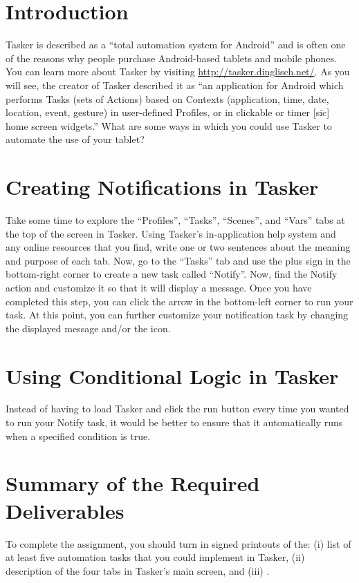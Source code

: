 

\usepackage[compact]{titlesec}



\section*{Introduction}

Tasker is described as a ``total automation system for Android'' and is often one of the reasons why people purchase
Android-based tablets and mobile phones.  You can learn more about Tasker by visiting
\url{http://tasker.dinglisch.net/}. As you will see, the creator of Tasker described it as ``an application for Android
which performs Tasks (sets of Actions) based on Contexts (application, time, date, location, event, gesture) in
user-defined Profiles, or in clickable or timer [sic] home screen widgets.''  What are some ways in which you could use
Tasker to automate the use of your tablet?

\section*{Creating Notifications in Tasker}

Take some time to explore the ``Profiles'', ``Tasks'', ``Scenes'', and ``Vars'' tabs at the top of the screen in Tasker.
Using Tasker's in-application help system and any online resources that you find, write one or two sentences about
the meaning and purpose of each tab. Now, go to the ``Tasks'' tab and use the plus sign in the bottom-right corner to
create a new task called ``Notify''.  Now, find the Notify action and customize it so that it will display a message.
Once you have completed this step, you can click the arrow in the bottom-left corner to run your task.  At this point,
you can further customize your notification task by changing the displayed message and/or the icon. 

\section*{Using Conditional Logic in Tasker}

Instead of having to load Tasker and click the run button every time you wanted to run your Notify task, it would be
better to ensure that it automatically runs when a specified condition is true.

\section*{Summary of the Required Deliverables}

To complete the assignment, you should turn in signed printouts of the: (i) list of at least five automation tasks
that you could implement in Tasker, (ii) description of the four tabs in Tasker's main screen, and (iii) .


